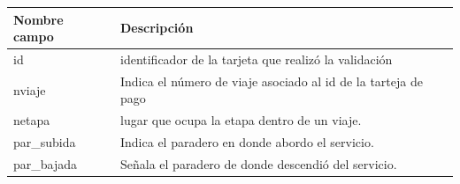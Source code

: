 \documentclass[12pt]{article}
\begin{document}
\begin{center}
  \begin{tabular}{| l | p{7cm} |}
    \hline
    Nombre campo & Descripción \\ \hline \hline
    id & identificador de la tarjeta que realizó la validación \\ \hline
    nviaje &  Indica el número de viaje asociado al id de la tarteja de pago\\ \hline
    netapa &  lugar que ocupa la etapa dentro de un viaje.\\ \hline
    par\_subida & Indica el paradero en donde abordo el servicio. \\ \hline
    par\_bajada & Señala el paradero de donde descendió del servicio. \\ \hline

\end{tabular}
\end{center}
\end{document}

